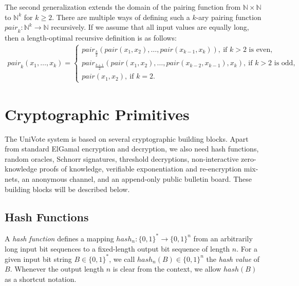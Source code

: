 \documentclass[bibtotoc,halfparskip,oneside]{scrreprt}
\begin{document}
The second generalization extends the domain of the pairing function from $\mathbb{N}\times\mathbb{N}$ to $\mathbb{N}^k$ for $k\geq 2$. There are multiple ways of defining such a $k$-ary pairing function $\mathit{pair}_k:\mathbb{N}^k\rightarrow \mathbb{N}$ recursively. If we assume that all input values are equally long, then a length-optimal recursive definition is as follows:
\begin{align}
	\mathit{pair}_k(x_1,\ldots,x_k) = \begin{cases}
		\mathit{pair}_{\frac{k}{2}}(\mathit{pair}(x_1,x_2),\ldots,\mathit{pair}(x_{k-1},x_k)),~\text{if $k>2$ is even},\\
		\mathit{pair}_{\frac{k+1}{2}}(\mathit{pair}(x_1,x_2),\ldots,\mathit{pair}(x_{k-2},x_{k-1}),x_k),~\text{if $k>2$ is odd},\\
		\mathit{pair}(x_1,x_2),~\text{if $k=2$}.			
	\end{cases}
\end{align}

\chapter{Cryptographic Primitives}

The UniVote system is based on several cryptographic building blocks. Apart from standard ElGamal encryption and decryption, we also need hash functions, random oracles, Schnorr signatures, threshold decryptions, non-interactive zero-knowledge proofs of knowledge, verifiable exponentiation and re-encryption mix-nets, an anonymous channel, and an append-only public bulletin board. These building blocks will be described below.

\section{Hash Functions} 

A \emph{hash function} defines a mapping $\mathit{hash}_n:\{0,1\}^*\rightarrow\{0,1\}^n$ from an arbitrarily long input bit sequences to a fixed-length output bit sequence of length $n$. For a given input bit string $B\in\{0,1\}^*$, we call $\mathit{hash}_n(B)\in\{0,1\}^n$ the \emph{hash value} of $B$. Whenever the output length $n$ is clear from the context, we allow $\mathit{hash}(B)$ as a shortcut notation.
\end{document}
